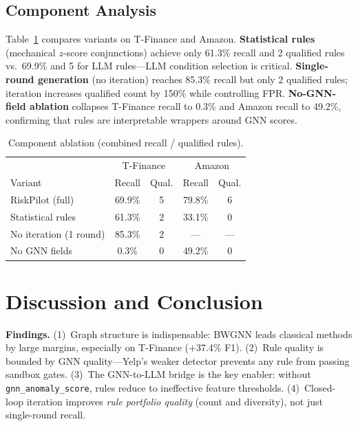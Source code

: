 \documentclass[sigconf,nonacm]{acmart}
\begin{document}
\subsection{Component Analysis}
Table~\ref{tab:ablation} compares variants on T-Finance and Amazon.
\textbf{Statistical rules} (mechanical $z$-score conjunctions) achieve only 61.3\% recall and 2 qualified rules vs.\ 69.9\% and 5 for LLM rules---LLM condition selection is critical.
\textbf{Single-round generation} (no iteration) reaches 85.3\% recall but only 2 qualified rules; iteration increases qualified count by 150\% while controlling FPR.
\textbf{No-GNN-field ablation} collapses T-Finance recall to 0.3\% and Amazon recall to 49.2\%, confirming that rules are interpretable wrappers around GNN scores.

\begin{table}[t]
\caption{Component ablation (combined recall / qualified rules).}
\label{tab:ablation}
\small
\begin{tabular}{lcc|cc}
\toprule
 & \multicolumn{2}{c|}{T-Finance} & \multicolumn{2}{c}{Amazon} \\
Variant & Recall & Qual. & Recall & Qual. \\
\midrule
RiskPilot (full)     & 69.9\% & 5 & 79.8\% & 6 \\
Statistical rules    & 61.3\% & 2 & 33.1\% & 0 \\
No iteration (1 round) & 85.3\% & 2 & --- & --- \\
No GNN fields        &  0.3\% & 0 & 49.2\% & 0 \\
\bottomrule
\end{tabular}
\end{table}

\section{Discussion and Conclusion}
\label{sec:disc}

\textbf{Findings.}
(1)~Graph structure is indispensable: BWGNN leads classical methods by large margins, especially on T-Finance (+37.4\% F1).
(2)~Rule quality is bounded by GNN quality---Yelp's weaker detector prevents any rule from passing sandbox gates.
(3)~The GNN-to-LLM bridge is the key enabler: without \texttt{gnn\_anomaly\_score}, rules reduce to ineffective feature thresholds.
(4)~Closed-loop iteration improves \textit{rule portfolio quality} (count and diversity), not just single-round recall.
\end{document}
